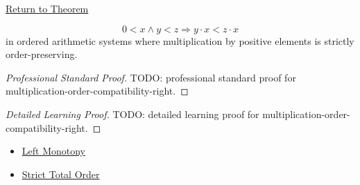 \newpage
{}
\label{prf:multiplication-order-compatibility-right}

\begin{remark*}[Return]
\hyperref[prop:multiplication-order-compatibility-right]{Return to Theorem}
\end{remark*}

\begin{proposition*}
\[
0<x \land y<z \Longrightarrow y\cdot x<z\cdot x
\]
in ordered arithmetic systems where multiplication by positive elements is
strictly order-preserving.
\end{proposition*}

\begin{proof}[Professional Standard Proof]
\LRAProofBodyStart
TODO: professional standard proof for multiplication-order-compatibility-right.
\end{proof}

\begin{proof}[Detailed Learning Proof]
\LRAProofBodyStart
TODO: detailed learning proof for multiplication-order-compatibility-right.
\end{proof}

\begin{remark*}
\end{remark*}

\begin{dependencies}
\begin{itemize}
  \item \hyperref[def:left-monotony]{Left Monotony}
  \item \hyperref[def:strict-total-order]{Strict Total Order}
\end{itemize}
\end{dependencies}

\clearpage
